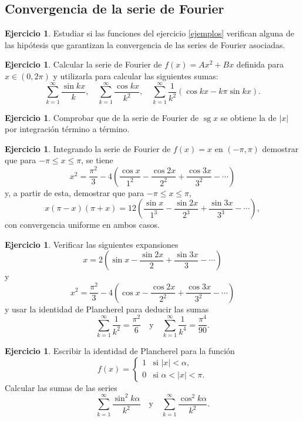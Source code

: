 \documentclass[12pt, a4paper]{amsbook}
\theoremstyle{remark}
\theoremstyle{definition}
\newtheorem{ejer}[teo]{Ejercicio}
\numberwithin{section}{chapter}
\numberwithin{subsection}{section}
\numberwithin{equation}{section}
\numberwithin{figure}{chapter}
\begin{document}
\subsection*{Convergencia de la serie de Fourier}

\begin{ejer}
Estudiar si las funciones del ejercicio \ref{ejemplos} verifican alguna de las hipótesis que garantizan la convergencia de las series de Fourier asociadas.
\end{ejer}

\begin{ejer}
Calcular la serie de Fourier de $f(x)=Ax^2+Bx$ definida para $x\in (0,2\pi)$ y utilizarla para calcular las siguientes sumas:
$$
\sum_{k=1}^\infty \frac{\sin kx}{k},\quad \sum_{k=1}^\infty \frac{\cos kx}{k^2},\quad \sum_{k=1}^\infty \frac{1}{k^2}(\cos kx - k\pi \sin kx).
$$
\end{ejer}

\begin{ejer}
Comprobar que de la serie de Fourier de $\operatorname{sg} x$ se obtiene la de $|x|$ por integración término a término.
\end{ejer}

\begin{ejer}
Integrando la serie de Fourier de $f(x)=x$ en $(-\pi, \pi)$ demostrar que para $-\pi\le x\le \pi$, se tiene
$$
x^2 = \frac{\pi^2}{3} - 4 \left(\frac{\cos x}{1^2} - \frac{\cos 2x}{2^2} + \frac{\cos 3x}{3^2} - \cdots \right)
$$
y, a partir de esta, demostrar que para $-\pi\le x\le \pi$,
$$
x(\pi - x)(\pi + x) = 12 \left(\frac{\sin x}{1^3} - \frac{\sin 2x}{2^3} + \frac{\sin 3x}{3^3}-\cdots\right),
$$
con convergencia uniforme en ambos casos.
\end{ejer}

\begin{ejer}
Verificar las siguientes expansiones
$$
x=2\left(\sin x - \frac{\sin 2x}{2} + \frac{\sin 3x}{3} - \cdots \right)
$$
y 
$$
x^2 = \frac{\pi^2}{3} - 4\left(\cos x - \frac{\cos 2x}{2^2} + \frac{\cos 3x}{3^2} - \cdots\right)
$$
y usar la identidad de Plancherel para deducir las sumas
$$
\sum_{k=1}^\infty \frac{1}{k^2} = \frac{\pi^2}{6} \quad \text{y}\quad \sum_{k=1}^\infty \frac{1}{k^4} = \frac{\pi^4}{90}.
$$
\end{ejer}

\begin{ejer}
Escribir la identidad de Plancherel para la función
$$
f(x) = \begin{cases}
1 & \text{si } |x|<\alpha,\\
0 & \text{si } \alpha < |x| < \pi.
\end{cases}
$$
Calcular las sumas de las series
$$
\sum_{k=1}^\infty \frac{\sin^2 k\alpha}{k^2} \quad \text{y}\quad \sum_{k=1}^\infty \frac{\cos^2 k\alpha}{k^2}.
$$
\end{ejer}
\end{document}
